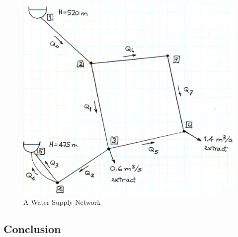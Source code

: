 \documentclass[11pt,a4paper]{article}
\begin{document}
\medskip
\begin{figure}[h]
	\centering	\includegraphics[width=0.6\linewidth]{Images/PipeNetwork.png}
	\caption{A Water-Supply Network}
	\label{fig:PipeNetwork}
\end{figure}

\subsection{Conclusion}
\end{document}

